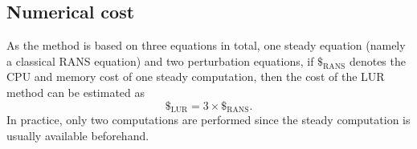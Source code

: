 \subsection{Numerical cost}
As the method is based on three equations in total, one steady equation 
(namely a classical RANS equation) and two perturbation equations, 
if $\mathdollar_{\text{RANS}}$ 
denotes the CPU and memory cost of
one steady computation, then the cost of the LUR
method can be estimated as
\begin{equation}
	\mathdollar_{\text{LUR}} = 3 \times \mathdollar_{\text{RANS}}.
\end{equation}
In practice, only two computations are performed since the steady computation
is usually available beforehand.
